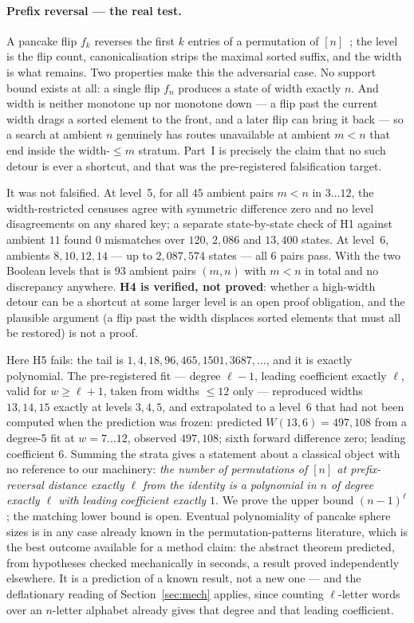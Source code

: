\documentclass[11pt,a4paper]{article}
\theoremstyle{plain}
\theoremstyle{definition}
\theoremstyle{remark}
\begin{document}
\paragraph{Prefix reversal --- the real test.}
A pancake flip $f_k$ reverses the first $k$ entries of a permutation of
$[n]$~\cite{Gates95,Bulteau15};
the level is the flip count, canonicalisation strips the maximal sorted suffix,
and the width is what remains. Two properties make this the adversarial case.
No support bound exists at all: a single flip $f_n$ produces a state of width
exactly $n$. And width is neither monotone up nor monotone down --- a flip past
the current width drags a sorted element to the front, and a later flip can
bring it back --- so a search at ambient $n$ genuinely has routes unavailable
at ambient $m < n$ that end inside the width-$\le m$ stratum. Part~I is
precisely the claim that no such detour is ever a shortcut, and that was the
pre-registered falsification target.

It was not falsified. At level~5, for all $45$ ambient pairs $m<n$ in
$3\ldots12$, the width-restricted censuses agree with symmetric difference zero
and no level disagreements on any shared key; a separate state-by-state check
of H1 against ambient $11$ found $0$ mismatches over $120$, $2{,}086$ and
$13{,}400$ states. At level~6, ambients $8,10,12,14$ --- up to $2{,}087{,}574$
states --- all $6$ pairs pass. With the two Boolean levels that is $93$ ambient
pairs $(m,n)$ with $m<n$ in total and no discrepancy anywhere. \textbf{H4 is verified, not
proved}: whether a high-width detour can be a shortcut at some larger level is
an open proof obligation, and the plausible argument (a flip past the width
displaces sorted elements that must all be restored) is not a proof.

Here H5 fails: the tail is $1, 4, 18, 96, 465, 1501, 3687, \dots$, and it is
exactly polynomial. The pre-registered fit --- degree $\ell-1$, leading
coefficient exactly $\ell$, valid for $w \ge \ell+1$, taken from widths
$\le 12$ only --- reproduced widths $13,14,15$ exactly at levels $3,4,5$, and
extrapolated to a level~6 that had not been computed when the prediction was
frozen: predicted $W(13,6) = 497{,}108$ from a degree-5 fit at $w=7\ldots12$,
observed $497{,}108$; sixth forward difference zero; leading coefficient $6$.
Summing the strata gives a statement about a classical object with no reference
to our machinery: \emph{the number of permutations of $[n]$ at prefix-reversal
distance exactly $\ell$ from the identity is a polynomial in $n$ of degree
exactly $\ell$ with leading coefficient exactly $1$}. We prove the upper bound
$(n-1)^\ell$; the matching lower bound is open. Eventual polynomiality of
pancake sphere sizes is in any case already known in the permutation-patterns
literature, which is the best outcome available for a method claim: the
abstract theorem predicted, from hypotheses checked mechanically in seconds, a
result proved independently elsewhere. It is a prediction of a known result,
not a new one --- and the deflationary reading of Section~\ref{sec:mech}
applies, since counting $\ell$-letter words over an $n$-letter alphabet already
gives that degree and that leading coefficient.
\end{document}
